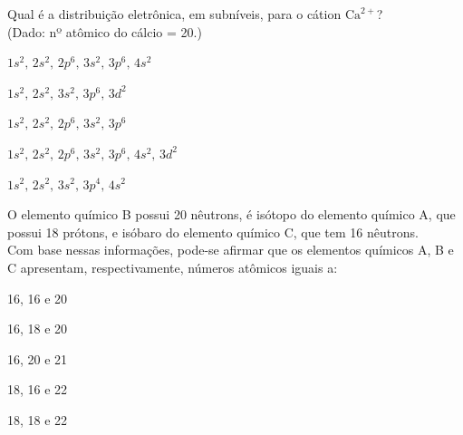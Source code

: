 \questao %
Qual é a distribuição eletrônica, em subníveis, para o cátion $\text{Ca}^{2+}$?\\
(Dado: nº atômico do cálcio = 20.)
\begin{alternativas}
\item $1s^2, \, 2s^2, \, 2p^6, \, 3s^2, \, 3p^6, \, 4s^2$
\item $1s^2, \, 2s^2,\, 3s^2, \, 3p^6, \, 3d^2$
\item $1s^2, \, 2s^2,\, 2p^6, \, 3s^2, \, 3p^6$
\item $1s^2, \, 2s^2,\, 2p^6, \, 3s^2, \, 3p^6, \, 4s^2, \, 3d^2$
\item $1s^2, \, 2s^2,\, 3s^2, \, 3p^4, \, 4s^2$
\end{alternativas}

\questao %
O elemento químico B possui 20 nêutrons, é isótopo do elemento químico A, que possui 18 prótons, e isóbaro do elemento químico C, que tem 16 nêutrons. \\
Com base nessas informações, pode-se afirmar que os elementos químicos A, B e C apresentam, respectivamente, números atômicos iguais a:
\begin{alternativas}
\item 16, 16 e 20 
\item 16, 18 e 20 
\item 16, 20 e 21
\item 18, 16 e 22 
\item 18, 18 e 22
\end{alternativas}

%
%

